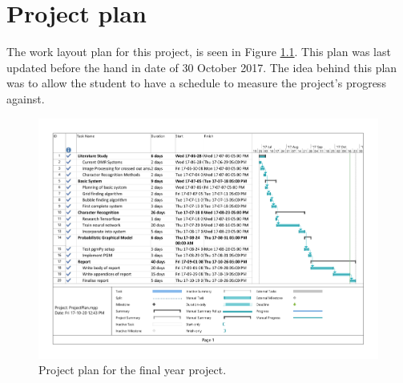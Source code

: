 \chapter{Project plan}
\label{ap:ProjectPlan}
\graphicspath{{Appendix1/Appendix1figures/}}
The work layout plan for this project, is seen in Figure \ref{fig:ProjectPlan}. This plan was last updated before the hand in date of 30 October 2017. The idea behind this plan was to allow the student to have a schedule to measure the project's progress against.

\begin{figure}
\centering
\includegraphics[scale=0.55, trim=35 54 35 35, clip, angle=90]{ProjectPlan}
\caption{Project plan for the final year project.}
\label{fig:ProjectPlan}
\end{figure}


